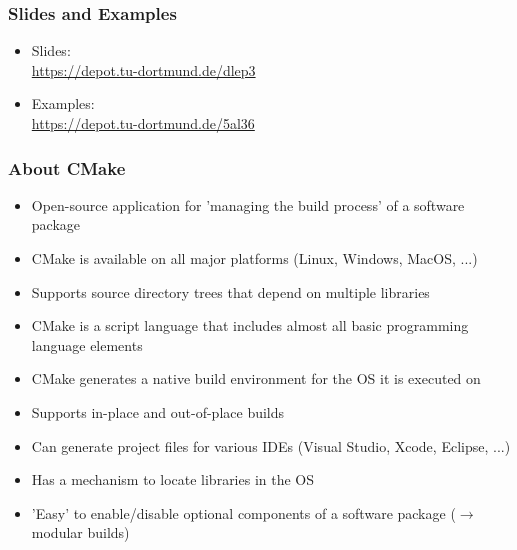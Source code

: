 \begin{frame}
	\frametitle{Slides and Examples}

        \begin{itemize}
		\item Slides:\\
                  \url{https://depot.tu-dortmund.de/dlep3}
		\item Examples:\\ 
                  \url{https://depot.tu-dortmund.de/5al36} 
        \end{itemize}

\end{frame}

\begin{frame}
  \frametitle{About CMake}

        \begin{itemize}
          \item Open-source application for 'managing the build process' of a software package
          \item CMake is available on all major platforms (Linux, Windows, MacOS, ...) 
          \item Supports source directory trees that depend on multiple libraries
          \item CMake is a script language that includes almost all basic programming language elements
          \item CMake generates a native build environment for the OS it is executed on
          \item Supports in-place and out-of-place builds
          \item Can generate project files for various IDEs (Visual Studio, Xcode, Eclipse, ...)
          \item Has a mechanism to locate libraries in the OS
          \item 'Easy' to enable/disable optional components of a software package ($\rightarrow$ modular builds)
        \end{itemize}
\end{frame}

